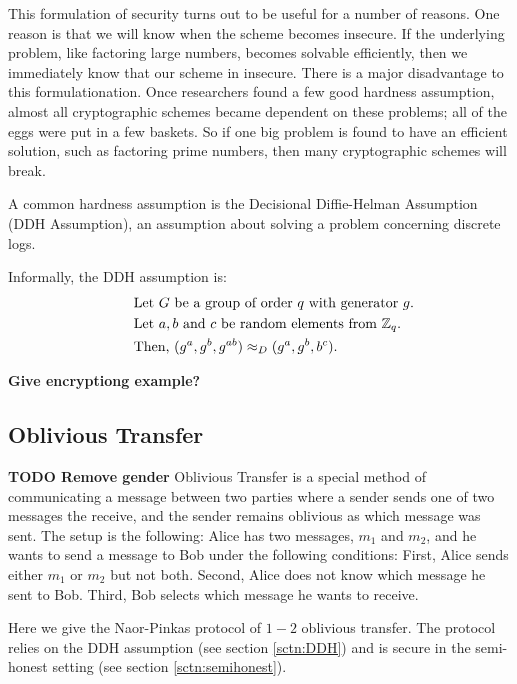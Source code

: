 This formulation of security turns out to be useful for a number of reasons. 
One reason is that we will know when the scheme becomes insecure. 
If the underlying problem, like factoring large numbers, becomes solvable efficiently, then we immediately know that our scheme in insecure.
There is a major disadvantage to this formulationation.
Once researchers found a few good hardness assumption, almost all cryptographic schemes became dependent on these problems; all of the eggs were put in a few baskets. 
So if one big problem is found to have an efficient solution, such as factoring prime numbers, then many cryptographic schemes will break.

A common hardness assumption is the Decisional Diffie-Helman Assumption (DDH Assumption), an assumption about solving a problem concerning discrete logs.

Informally, the DDH assumption is:
\begin{equation}
	\label{eqn:DDH}
	\begin{split}
	& \qquad \text{Let $G$ be a group of order $q$ with generator $g$.} \\
	& \qquad \text{Let $a, b$ and $c$ be random elements from $\mathbb{Z}_q$.} \\
	& \qquad \text{Then, $(g^a, g^b, g^{ab}) \approx_D (g^a, g^b, b^c)$}. 
	\end{split}
\end{equation}

\textbf{Give encryptiong example?}


\subsection{Oblivious Transfer}
\textbf{TODO Remove gender}
Oblivious Transfer is a special method of communicating a message between two parties where a sender sends one of two messages the receive, and the sender remains oblivious as which message was sent.
The setup is the following:
Alice has two messages, $m_1$ and $m_2$, and he wants to send a message to Bob under the following conditions: First, Alice sends either $m_1$ or $m_2$ but not both. Second, Alice does not know which message he sent to Bob. Third, Bob selects which message he wants to receive.

Here we give the Naor-Pinkas protocol of $1-2$ oblivious transfer.
The protocol relies on the DDH assumption (see section \ref{sctn:DDH}) and is secure in the semi-honest setting (see section \ref{sctn:semihonest}).

